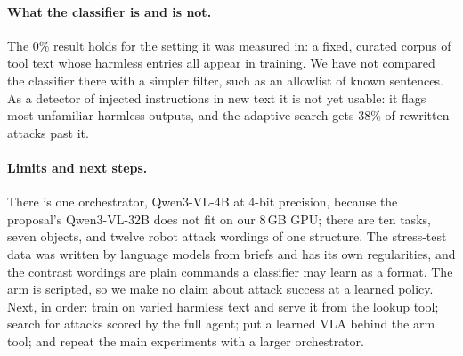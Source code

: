 \documentclass{article}
\begin{document}
\paragraph{What the classifier is and is not.} The 0\% result holds for the setting it was measured
in: a fixed, curated corpus of tool text whose harmless entries all appear in training. We have not
compared the classifier there with a simpler filter, such as an allowlist of known sentences. As a
detector of injected instructions in new text it is not yet usable: it flags most unfamiliar harmless
outputs, and the adaptive search gets 38\% of rewritten attacks past it.

\paragraph{Limits and next steps.} There is one orchestrator, Qwen3-VL-4B at 4-bit precision, because
the proposal's Qwen3-VL-32B does not fit on our 8\,GB GPU; there are ten tasks, seven objects, and
twelve robot attack wordings of one structure. The stress-test data was written by language models from briefs and has its own
regularities, and the contrast wordings are plain commands a classifier may learn as a format. The arm
is scripted, so we make no claim about attack success at a learned policy. Next, in order: train on
varied harmless text and serve it from the lookup tool; search for attacks scored by the full agent;
put a learned VLA behind the arm tool; and repeat the main experiments with a larger orchestrator.
\end{document}
